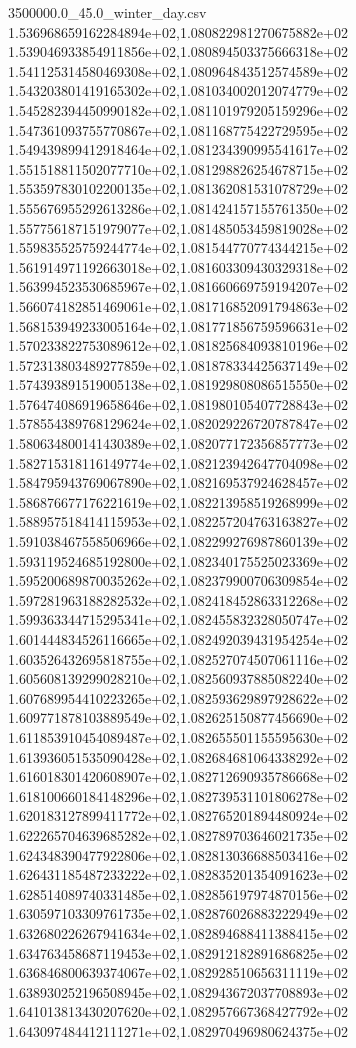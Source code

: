 \begin{filecontents*}{3500000.0_45.0_winter_day.csv}
1.536968659162284894e+02,1.080822981270675882e+02
1.539046933854911856e+02,1.080894503375666318e+02
1.541125314580469308e+02,1.080964843512574589e+02
1.543203801419165302e+02,1.081034002012074779e+02
1.545282394450990182e+02,1.081101979205159296e+02
1.547361093755770867e+02,1.081168775422729595e+02
1.549439899412918464e+02,1.081234390995541617e+02
1.551518811502077710e+02,1.081298826254678715e+02
1.553597830102200135e+02,1.081362081531078729e+02
1.555676955292613286e+02,1.081424157155761350e+02
1.557756187151979077e+02,1.081485053459819028e+02
1.559835525759244774e+02,1.081544770774344215e+02
1.561914971192663018e+02,1.081603309430329318e+02
1.563994523530685967e+02,1.081660669759194207e+02
1.566074182851469061e+02,1.081716852091794863e+02
1.568153949233005164e+02,1.081771856759596631e+02
1.570233822753089612e+02,1.081825684093810196e+02
1.572313803489277859e+02,1.081878334425637149e+02
1.574393891519005138e+02,1.081929808086515550e+02
1.576474086919658646e+02,1.081980105407728843e+02
1.578554389768129624e+02,1.082029226720787847e+02
1.580634800141430389e+02,1.082077172356857773e+02
1.582715318116149774e+02,1.082123942647704098e+02
1.584795943769067890e+02,1.082169537924628457e+02
1.586876677176221619e+02,1.082213958519268999e+02
1.588957518414115953e+02,1.082257204763163827e+02
1.591038467558506966e+02,1.082299276987860139e+02
1.593119524685192800e+02,1.082340175525023369e+02
1.595200689870035262e+02,1.082379900706309854e+02
1.597281963188282532e+02,1.082418452863312268e+02
1.599363344715295341e+02,1.082455832328050747e+02
1.601444834526116665e+02,1.082492039431954254e+02
1.603526432695818755e+02,1.082527074507061116e+02
1.605608139299028210e+02,1.082560937885082240e+02
1.607689954410223265e+02,1.082593629897928622e+02
1.609771878103889549e+02,1.082625150877456690e+02
1.611853910454089487e+02,1.082655501155595630e+02
1.613936051535090428e+02,1.082684681064338292e+02
1.616018301420608907e+02,1.082712690935786668e+02
1.618100660184148296e+02,1.082739531101806278e+02
1.620183127899411772e+02,1.082765201894480924e+02
1.622265704639685282e+02,1.082789703646021735e+02
1.624348390477922806e+02,1.082813036688503416e+02
1.626431185487233222e+02,1.082835201354091623e+02
1.628514089740331485e+02,1.082856197974870156e+02
1.630597103309761735e+02,1.082876026883222949e+02
1.632680226267941634e+02,1.082894688411388415e+02
1.634763458687119453e+02,1.082912182891686825e+02
1.636846800639374067e+02,1.082928510656311119e+02
1.638930252196508945e+02,1.082943672037708893e+02
1.641013813430207620e+02,1.082957667368427792e+02
1.643097484412111271e+02,1.082970496980624375e+02

\end{filecontents*}
